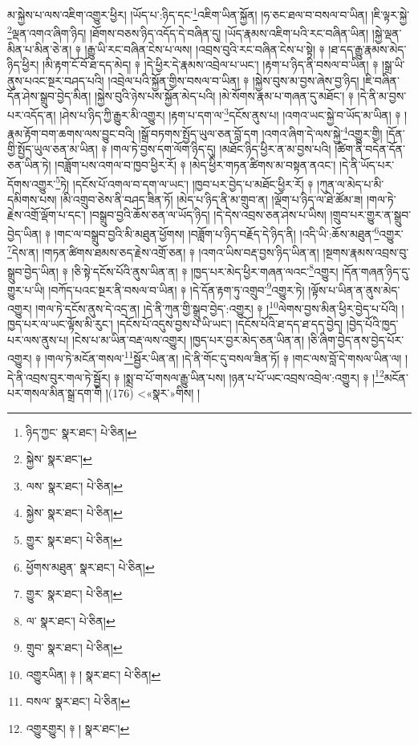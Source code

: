 མ་སྐྱེས་པ་ལས་འཇིག་འགྱུར་ཕྱིར། །ཡོད་པ་:ཉིད་དང་\footnote{ཉིད་ཀྱང་  སྣར་ཐང་།  པེ་ཅིན། }འཇིག་ཡིན་སྐྱོན། །ཧ་ཅང་ཐལ་བ་བསལ་བ་ཡིན། །ཇི་ལྟར་སྐྱེ་\footnote{སྐྱེས་  སྣར་ཐང་། }ལྡན་འགའ་ཞིག་ཉིད། །ཐོགས་བཅས་ཉིད་འདོད་དེ་བཞིན་དུ། །ཡོད་རྣམས་འཇིག་པའི་རང་བཞིན་ཡིན། །སྐྱེ་ལྡན་མིན་པ་མིན་ཅེ་ན། ༈ །རྒྱུ་ཡི་རང་བཞིན་ངེས་པ་ལས། །འབྲས་བུའི་རང་བཞིན་ངེས་པ་སྟེ། ༈ །ཐ་དད་རྒྱུ་རྣམས་མེད་ཉིད་ཕྱིར། །མི་རྟག་ངོ་བོ་ཐ་དད་མེད། ༈ །དེ་ཕྱིར་དེ་རྣམས་འབྲེལ་པ་ཡང་། །རྟག་པ་ཉིད་ནི་བསལ་བ་ཡིན། ༈ །སྒྲ་ཡི་ནུས་པའང་སྔར་བཤད་པའི། །འབྲེལ་པའི་སྐྱོན་གྱིས་བསལ་བ་ཡིན། ༈ །སྐྱེས་བུས་མ་བྱས་ཞེས་བྱ་ཉིད། །ཇི་བཞིན་དོན་ཤེས་སྒྲུབ་བྱེད་མིན། །སྐྱེས་བུའི་ཉེས་པས་སྐྱོན་མེད་པའི། །མེ་སོགས་རྣམ་པ་གཞན་དུ་མཐོང་། ༈ །དེ་ནི་མ་བྱས་པར་འདོད་ན། །ཤེས་པ་ཉིད་ཀྱི་རྒྱུར་མི་འགྱུར། །རྟག་པ་དག་ལ་\footnote{ལས་  སྣར་ཐང་།  པེ་ཅིན། }དངོས་ནུས་པ། །འགའ་ཡང་སྐྱེ་བ་ཡོད་མ་ཡིན། ༈ །རྣམ་རྟོག་བག་ཆགས་ལས་བྱུང་བའི། །སྒྲོ་བཏགས་སྤྱོད་ཡུལ་ཅན་བློ་དག །འགའ་ཞིག་དེ་ལས་སྐྱེ་\footnote{སྐྱེས་  སྣར་ཐང་།  པེ་ཅིན། }འགྱུར་གྱི། །དོན་གྱི་སྤྱོད་ཡུལ་ཅན་མ་ཡིན། ༈ །གལ་ཏེ་བྱས་དག་ལོག་ཉིད་དུ། །མཐོང་ཉིད་ཕྱིར་ན་མ་བྱས་པའི། །ཚིག་ནི་བདེན་དོན་ཅན་ཡིན་ཏེ། །བཟློག་པས་འགལ་བ་ཁྱབ་ཕྱིར་རོ། ༈ །མེད་ཕྱིར་གཏན་ཚིགས་མ་བསྟན་ནའང་། །དེ་ནི་ཡོད་པར་དོགས་འགྱུར་\footnote{གྱུར་  སྣར་ཐང་།  པེ་ཅིན། }ཏེ། །དངོས་པོ་འགལ་བ་དག་ལ་ཡང་། །ཁྱབ་པར་བྱེད་པ་མཐོང་ཕྱིར་རོ། ༈ །ཀུན་ལ་མེད་པ་མི་དམིགས་པས། །མི་འགྲུབ་ཅེས་ནི་བཤད་ཟིན་ཏོ། །མེད་པ་ཉིད་ནི་མ་གྲུབ་ན། །ལྡོག་པ་ཉིད་ལ་ཐེ་ཚོམ་ཟ། །གལ་ཏེ་རྗེས་འགྲོ་ལྡོག་པ་དང་། །བསྒྲུབ་བྱའི་ཆོས་ཅན་ལ་ཡོད་ཉིད། །དེ་དེས་འབྲས་ཅན་ཤེས་པ་ཡིས། །གྲུབ་པར་གྱུར་ན་སྒྲུབ་བྱེད་ཡིན། ༈ །གང་ལ་བསྒྲུབ་བྱའི་མི་མཐུན་ཕྱོགས། །བཟློག་པ་ཉིད་བརྗོད་དེ་ཉིད་ནི། །འདི་ཡི་:ཆོས་མཐུན་\footnote{ཕྱོགས་མཐུན་  སྣར་ཐང་།  པེ་ཅིན། }འགྱུར་\footnote{གྱུར་  སྣར་ཐང་།  པེ་ཅིན། }དེས་ན། །གཏན་ཚིགས་ཐམས་ཅད་རྗེས་འགྲོ་ཅན། ༈ །འགའ་ཡིས་བརྡ་བྱས་ཉིད་ཡིན་ན། །སྔགས་རྣམས་འབྲས་བུ་སྒྲུབ་བྱེད་ཡིན། ༈ །ཅི་སྟེ་དངོས་པོའི་ནུས་ཡིན་ན། ༈ །ཁྱད་པར་མེད་ཕྱིར་གཞན་ལའང་\footnote{ལ་  སྣར་ཐང་།  པེ་ཅིན། }འགྱུར། །དོན་གཞན་ཉིད་དུ་གྱུར་པ་ཡི། །བཀོད་པའང་སྔར་ནི་བསལ་བ་ཡིན། ༈ །དེ་དོན་རྟག་ཏུ་འགྲུབ་\footnote{གྲུབ་  སྣར་ཐང་།  པེ་ཅིན། }འགྱུར་ཏེ། །ལྟོས་པ་ཡིན་ན་ནུས་མེད་འགྱུར། །གལ་ཏེ་དངོས་ནུས་དེ་འདྲ་ན། །དེ་ནི་ཀུན་གྱི་སྒྲུབ་བྱེད་:འགྱུར། ༈ །\footnote{འགྱུརཡིན། ༈ །  སྣར་ཐང་།  པེ་ཅིན། }ལེགས་བྱས་མིན་ཕྱིར་བྱེད་པ་པོའི། །ཁྱད་པར་ལ་ཡང་ལྟོས་མི་རུང་། །དངོས་པོ་འདུས་བྱས་པ་ཡི་ཡང་། །དངོས་པོའི་ཐ་དད་ཐ་དད་བྱེད། །བྱེད་པོའི་ཁྱད་པར་ལས་ནུས་པ། །ངེས་པ་མ་ཡིན་བརྡ་ལས་འགྱུར། །ཁྱད་པར་བྱར་མེད་ཅན་ཡིན་ན། །ཅི་ཞིག་བྱེད་ནས་བྱེད་པོར་འགྱུར། ༈ །གལ་ཏེ་མངོན་གསལ་\footnote{བསལ་  སྣར་ཐང་།  པེ་ཅིན། }སྦྱོར་ཡིན་ན། །དེ་ནི་གོང་དུ་བསལ་ཟིན་ཏོ། ༈ །གང་ལས་བློ་དེ་གསལ་ཡིན་ལ། །དེ་ནི་འབྲས་བུར་གལ་ཏེ་སྦྱོར། ༈ །སྨྲ་བ་པོ་གསལ་རྒྱུ་ཡིན་པས། །ཉན་པ་པོ་ཡང་འབྲས་འབྲེལ་:འགྱུར། ༈ །\footnote{འགྱུརགྱུར། ༈ །  སྣར་ཐང་། }མངོན་པར་གསལ་མིན་སྒྲ་དག་གི །(176) <«སྣར་»གིས། །
